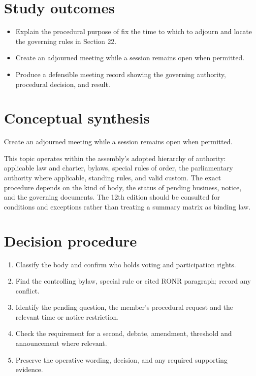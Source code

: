 \documentclass[11pt]{article}
\begin{document}
\SuiteOpen
{}
\section{Study outcomes}
\begin{itemize}[leftmargin=*,itemsep=4pt]
\item Explain the procedural purpose of fix the time to which to adjourn and locate the governing rules in Section 22.
\item Create an adjourned meeting while a session remains open when permitted.
\item Produce a defensible meeting record showing the governing authority, procedural decision, and result.
\end{itemize}

\section{Conceptual synthesis}
Create an adjourned meeting while a session remains open when permitted.

This topic operates within the assembly’s adopted hierarchy of authority: applicable law and charter, bylaws, special rules of order, the parliamentary authority where applicable, standing rules, and valid custom. The exact procedure depends on the kind of body, the status of pending business, notice, and the governing documents. The 12th edition should be consulted for conditions and exceptions rather than treating a summary matrix as binding law.
\section{Decision procedure}
\begin{enumerate}[leftmargin=*,itemsep=4pt]
\item Classify the body and confirm who holds voting and participation rights.
\item Find the controlling bylaw, special rule or cited RONR paragraph; record any conflict.
\item Identify the pending question, the member’s procedural request and the relevant time or notice restriction.
\item Check the requirement for a second, debate, amendment, threshold and announcement where relevant.
\item Preserve the operative wording, decision, and any required supporting evidence.
\end{enumerate}
\end{document}
